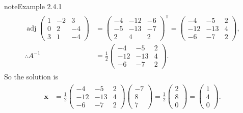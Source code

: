 \documentclass[letterpaper,10pt,english]{jupyterBook}
\begin{document}
\begin{sphinxadmonition}{note}{Example 2.4.1}
\begin{equation*}
\begin{split} \begin{align*}
    \operatorname{adj} \begin{pmatrix} 1 & -2 & 3 \\ 0 & 2 & -4 \\ 3 & 1 & -4 \end{pmatrix}
    &= \begin{pmatrix} -4 & -12 & -6 \\ -5 & -13 & -7 \\ 2 & 4 & 2 \end{pmatrix}^\mathsf{T}
    = \begin{pmatrix} -4 & -5 & 2 \\ -12 & -13 & 4 \\ -6 & -7 & 2 \end{pmatrix}, \\
    \therefore A^{-1} &= \frac{1}{2}
    \begin{pmatrix}
        -4 & -5 & 2 \\
        -12 & -13 & 4 \\
        -6 & -7 & 2
    \end{pmatrix}.
\end{align*} \end{split}
\end{equation*}
\sphinxAtStartPar
So the solution is
\begin{equation*}
\begin{split} \begin{align*}
    \mathbf{x} &= \frac{1}{2}
    \begin{pmatrix}
        -4 & -5 & 2 \\
        -12 & -13 & 4 \\
        -6 & -7 & 2
    \end{pmatrix}
    \begin{pmatrix}-7 \\ 8 \\ 7 \end{pmatrix}
    = \frac{1}{2} \begin{pmatrix} 2 \\ 8 \\ 0 \end{pmatrix}
    = \begin{pmatrix} 1 \\4 \\ 0 \end{pmatrix}.
\end{align*} \end{split}

\end{equation*}
\end{sphinxadmonition}
\end{document}
